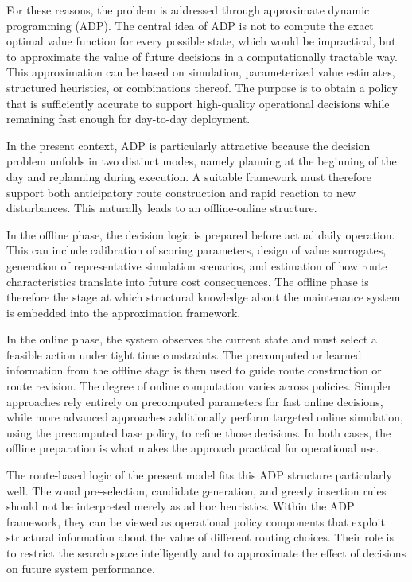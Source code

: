 \documentclass[12pt,oneside]{article}
\begin{document}
For these reasons, the problem is addressed through approximate dynamic programming (ADP). The central idea of ADP is not to compute the exact optimal value function for every possible state, which would be impractical, but to approximate the value of future decisions in a computationally tractable way. This approximation can be based on simulation, parameterized value estimates, structured heuristics, or combinations thereof. The purpose is to obtain a policy that is sufficiently accurate to support high-quality operational decisions while remaining fast enough for day-to-day deployment.

In the present context, ADP is particularly attractive because the decision problem unfolds in two distinct modes, namely planning at the beginning of the day and replanning during execution. A suitable framework must therefore support both anticipatory route construction and rapid reaction to new disturbances. This naturally leads to an offline-online structure.

In the offline phase, the decision logic is prepared before actual daily operation. This can include calibration of scoring parameters, design of value surrogates, generation of representative simulation scenarios, and estimation of how route characteristics translate into future cost consequences. The offline phase is therefore the stage at which structural knowledge about the maintenance system is embedded into the approximation framework.

In the online phase, the system observes the current state and must select a feasible action under tight time constraints. The precomputed or learned information from the offline stage is then used to guide route construction or route revision. The degree of online computation varies across policies. Simpler approaches rely entirely on precomputed parameters for fast online decisions, while more advanced approaches additionally perform targeted online simulation, using the precomputed base policy, to refine those decisions. In both cases, the offline preparation is what makes the approach practical for operational use.

The route-based logic of the present model fits this ADP structure particularly well. The zonal pre-selection, candidate generation, and greedy insertion rules should not be interpreted merely as ad hoc heuristics. Within the ADP framework, they can be viewed as operational policy components that exploit structural information about the value of different routing choices. Their role is to restrict the search space intelligently and to approximate the effect of decisions on future system performance.
\end{document}
